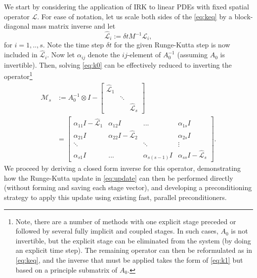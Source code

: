 \documentclass[review]{siamart}
\begin{document}
We start by considering the application of IRK to linear PDEs with fixed
spatial operator $\mathcal{L}$. For ease of notation, let us scale both sides
of the \eqref{eq:keq} by a block-diagonal mass matrix inverse and let
%
\begin{equation*}
\widehat{\mathcal{L}}_i := \delta t M^{-1}\mathcal{L}_i,
\end{equation*}
%
for $i=1,..,s$. Note the time step $\delta t$ for the given Runge-Kutta step is now
included in $\widehat{\mathcal{L}}_i$. Now let $\alpha_{ij}$ denote the $ij$-element
of $A_0^{-1}$ (assuming $A_0$ is invertible). Then, solving \eqref{eq:k0} can be 
effectively reduced to inverting the operator\footnote{Note, there are a number of
methods with one explicit stage preceded or followed by several fully implicit and
coupled stages. In such cases, $A_0$ is not invertible, but the explicit stage can
be eliminated from the system (by doing an explicit time step). The remaining operator
can then be reformulated as in \eqref{eq:keq}, and the inverse that must be applied
takes the form of \eqref{eq:k1} but based on a principle submatrix of $A_0$.}
%
\begin{align}\nonumber
\mathcal{M}_s & := A_0^{-1}\otimes I - \begin{bmatrix} \widehat{\mathcal{L}}_1  & \\ & \ddots \\ && \widehat{\mathcal{L}}_s\end{bmatrix} \\
& = \begin{bmatrix} \alpha_{11}I - \widehat{\mathcal{L}}_1 & \alpha_{12}I & ... & \alpha_{1s}I \\
	\alpha_{21}I & \alpha_{22}I - \widehat{\mathcal{L}}_2 & & \alpha_{2s}I \\
	\ddots & & \ddots & \vdots \\ \alpha_{s1}I & ... & \alpha_{s(s-1)}I & \alpha_{ss}I - \widehat{\mathcal{L}}_s \end{bmatrix}.
	\label{eq:k1}
\end{align}
%
We proceed by deriving a closed form inverse for this operator, demonstrating
how the Runge-Kutta update in \eqref{eq:update} can then be performed directly
(without forming and saving each stage vector), and developing a preconditioning
strategy to apply this update using existing fast, parallel preconditioners. 

\end{document}
